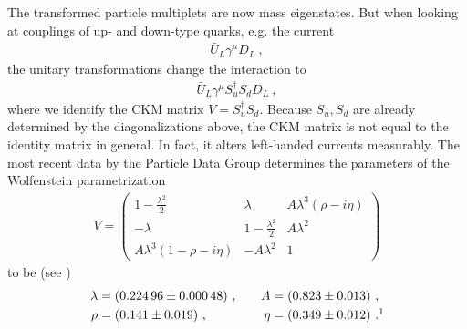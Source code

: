 The transformed particle multiplets are now mass eigenstates. But when looking at couplings of up- and down-type quarks, e.g. the current
\begin{align}
	\bar{U}_L\gamma^\mu D_L \ ,
\end{align}
the unitary transformations change the interaction to
\begin{align}
	\bar{U}_L\gamma^\mu S_u^\dagger S_d D_L \ ,
\end{align}
where we identify the CKM matrix $V=S_u^\dagger S_d$. Because $S_u,S_d$ are already determined by the diagonalizations above, the CKM matrix is not equal to the identity matrix in general. In fact, it alters left-handed currents measurably. The most recent data by the Particle Data Group determines the parameters of the Wolfenstein parametrization
\begin{align}
	V = \begin{pmatrix}
	1-\frac{\lambda^2}{2} & \lambda & A\lambda^3(\rho-i\eta) \\
	-\lambda & 1-\frac{\lambda^2}{2} & A\lambda^2 \\
	A\lambda^3(1-\rho-i\eta) & -A\lambda^2 & 1
	\end{pmatrix}
\end{align}
to be (see \cite[Chapter 12]{PDG})
\begin{align}\label{eq:Wolf}
	\lambda &= \SI{0.22496(48)}{} \ , && &A &= \SI{0.823(13)}{} \ , \notag \\
	\rho &= \SI{0.141(19)}{} \ , && &\eta &= \SI{0.349(12)}{} \ .\footnotemark
\end{align}
